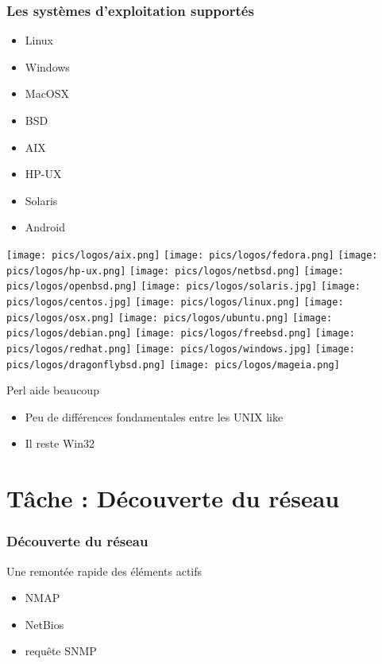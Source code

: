 \documentclass{beamer}
\begin{document}
\begin{frame}
    \frametitle{Les systèmes d'exploitation supportés}

    \begin{itemize}
        \item Linux
        \item Windows
        \item MacOSX
        \item BSD
        \item AIX
        \item HP-UX
        \item Solaris
        \item Android
    \end{itemize}


\texttt{[image: pics/logos/aix.png]}
\texttt{[image: pics/logos/fedora.png]}
\texttt{[image: pics/logos/hp-ux.png]}
\texttt{[image: pics/logos/netbsd.png]}
\texttt{[image: pics/logos/openbsd.png]}
\texttt{[image: pics/logos/solaris.jpg]}
\texttt{[image: pics/logos/centos.jpg]}
\texttt{[image: pics/logos/linux.png]}
\texttt{[image: pics/logos/osx.png]}
\texttt{[image: pics/logos/ubuntu.png]}
\texttt{[image: pics/logos/debian.png]}
\texttt{[image: pics/logos/freebsd.png]}
\texttt{[image: pics/logos/redhat.png]}
\texttt{[image: pics/logos/windows.jpg]}
\texttt{[image: pics/logos/dragonflybsd.png]}
\texttt{[image: pics/logos/mageia.png]}

\end{frame}

\begin{frame}    
    \begin{block}{Perl aide beaucoup}
        \begin{itemize}
            \item Peu de différences fondamentales entre les UNIX like
            \item Il reste Win32
        \end{itemize}
    \end{block}
\end{frame}

\section{Tâche : Découverte du réseau}

\begin{frame}
    \frametitle{Découverte du réseau}

    \begin{block}{Une remontée rapide des éléments actifs}
    \begin{itemize}
      \item NMAP 
      \item NetBios
      \item requête SNMP
    \end{itemize}
    \end{block}

\end{frame}
\end{document}
